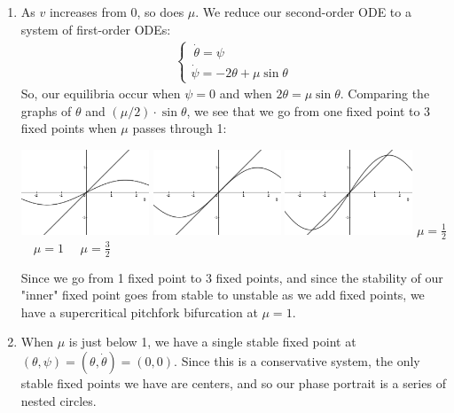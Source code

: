 \documentclass[10pt,letterpaper]{report}
\begin{document}
\begin{enumerate}
\begin{enumerate}
        \item As $v$ increases from 0, so does $\mu$. We reduce our second-order ODE to a system of first-order ODEs:
        \begin{align*}
            \begin{cases}
            \:\dot \theta = \psi \\
            \dot \psi = -2\theta + \mu \sin\theta
            \end{cases}
        \end{align*}
        So, our equilibria occur when $\psi = 0$ and when $2\theta = \mu \sin\theta$. Comparing the graphs of $\theta$ and $(\mu/2)\cdot \sin\theta$, we see that we go from one fixed point to 3 fixed points when $\mu$ passes through 1:
        \begin{center}
        \includegraphics[width=0.3\textwidth]{img/2019S1-1.png}
        \quad 
        \includegraphics[width=0.3\textwidth]{img/2019S1-2.png}
        \quad 
        \includegraphics[width=0.3\textwidth]{img/2019S1-3.png}
        $\mu = \frac{1}{2}$ \qquad  \qquad\qquad \qquad \qquad \qquad \ \ $\mu = 1$ \qquad \qquad\qquad \qquad \qquad \qquad \ \  $\mu = \frac{3}{2}$
        \end{center}
        Since we go from 1 fixed point to 3 fixed points, and since the stability of our "inner" fixed point goes from stable to unstable as we add fixed points, we have a supercritical pitchfork bifurcation at $\mu = 1$.
        
        \item When $\mu$ is just below 1, we have a single stable fixed point at $(\theta, \psi) = (\theta, \dot\theta) = (0, 0)$. Since this is a conservative system, the only stable fixed points we have are centers, and so our phase portrait is a series of nested circles.
        

\end{enumerate}
\end{enumerate}
\end{document}
